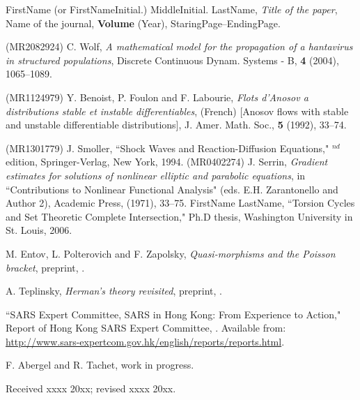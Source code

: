 \documentclass{aims}
\theoremstyle{definition}
\begin{document}
\begin{thebibliography}{99}


     \newblock FirstName (or FirstNameInitial.) MiddleInitial. LastName, %
     \newblock \emph{Title of the paper},
     \newblock Name of the journal, \textbf{Volume} (Year), StaringPage--EndingPage.

 (MR2082924)
     \newblock C. Wolf,
     \newblock \emph{A mathematical model for the propagation of a hantavirus in structured populations},
     \newblock Discrete Continuous Dynam. Systems - B, \textbf{4} (2004), 1065--1089.

 (MR1124979)
    \newblock Y. Benoist, P. Foulon and F. Labourie, %
    \newblock \emph{Flots d'Anosov a distributions stable et instable
     differentiables},
    \newblock (French) [Anosov flows with stable and unstable differentiable
     distributions], J. Amer. Math. Soc., \textbf{5} (1992), 33--74.

 (MR1301779)
     \newblock J. Smoller,
     \newblock ``Shock Waves and Reaction-Diffusion Equations,"
     $^{nd}$ edition, Springer-Verlag, New York, 1994.
 (MR0402274)
    \newblock J. Serrin,
    \newblock  \emph{Gradient estimates for solutions of nonlinear elliptic
                     and parabolic equations},
    \newblock  in ``Contributions to Nonlinear Functional Analysis" (eds. E.H. Zarantonello and Author 2),
                Academic Press, (1971), 33--75.
    \newblock FirstName LastName,
    \newblock  ``Torsion Cycles and Set Theoretic Complete Intersection,"
    \newblock  Ph.D thesis, Washington University in St. Louis, 2006.

\newblock M. Entov, L. Polterovich and F. Zapolsky,
\newblock \emph{Quasi-morphisms and the Poisson bracket},
\newblock  preprint, .

\newblock A. Teplinsky,
\newblock \emph{Herman's theory revisited},
\newblock preprint, .

\newblock
\newblock ``SARS Expert Committee, SARS in Hong Kong: From Experience to
Action," Report of Hong Kong SARS Expert Committee,
. Available from: \url{http://www.sars-expertcom.gov.hk/english/reports/reports.html}.

\newblock F. Abergel and R. Tachet,
\newblock
\newblock work in progress.

\end{thebibliography}

\medskip
Received xxxx 20xx; revised xxxx 20xx.
\medskip
\end{document}

